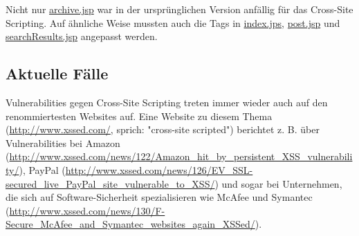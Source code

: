Nicht nur \url{archive.jsp} war in der ursprünglichen Version anfällig für das Cross-Site Scripting. Auf ähnliche Weise mussten auch die Tags in \url{index.jps}, \url{post.jsp} und \url{searchResults.jsp} angepasst werden.

\subsection{Aktuelle Fälle}

Vulnerabilities gegen Cross-Site Scripting treten immer wieder auch auf den renommiertesten Websites auf. Eine Website zu diesem Thema (\url{http://www.xssed.com/}, sprich: "cross-site scripted") berichtet z. B. über Vulnerabilities bei Amazon (\url{http://www.xssed.com/news/122/Amazon_hit_by_persistent_XSS_vulnerability/}), PayPal (\url{http://www.xssed.com/news/126/EV_SSL-secured_live_PayPal_site_vulnerable_to_XSS/}) und sogar bei Unternehmen, die sich auf Software-Sicherheit spezialisieren wie McAfee und Symantec (\url{http://www.xssed.com/news/130/F-Secure_McAfee_and_Symantec_websites_again_XSSed/}).

 
